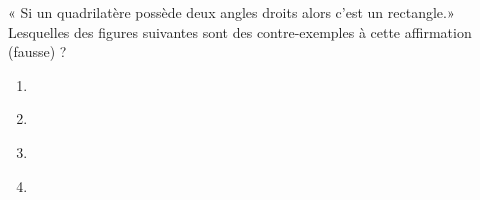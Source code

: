 
\begin{exercice}\label{exosmath-0789}

    « Si un quadrilatère possède deux angles droits alors c'est un rectangle.» Lesquelles des figures suivantes sont des contre-exemples à cette affirmation (fausse) ?


    \begin{multicols}{2}
    \begin{enumerate}
        \item
            \begin{center}
               
            \end{center}

        \item
        \begin{center}
            
        \end{center}
    \item

\begin{center}
   
\end{center}

\item
\begin{center}
   
\end{center}


    \end{enumerate}
    \end{multicols}
    
\end{exercice}

